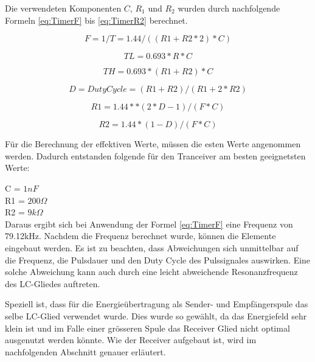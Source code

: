 Die verwendeten Komponenten $C$, $R_{1}$ und $R_{2}$ wurden durch nachfolgende Formeln \ref{eq:TimerF} bis \ref{eq:TimerR2} berechnet. 

\begin{equation}\label{eq:TimerF}
F=1/T= 1.44/((R1+R2*2)*C)
\end{equation} 

\begin{equation}\label{eq:TimerTL}
TL= 0.693*R*C
\end{equation}

\begin{equation}\label{eq:TimerTH}
TH= 0.693*(R1+R2)*C
\end{equation}

\begin{equation}\label{eq:TimerD}
D= Duty Cycle= (R1+R2)/(R1+2*R2)
\end{equation}

\begin{equation}\label{eq:TimerR1}
R1= 1.44**(2*D-1)/(F*C)
\end{equation}

\begin{equation}\label{eq:TimerR2}
R2= 1.44*(1-D)/(F*C)
\end{equation}

Für die Berechnung der effektiven Werte, müssen die esten Werte angenommen werden. Dadurch entstanden folgende für den Tranceiver am besten geeignetsten Werte:
 
C = $1nF$\\
R1 = $200\Omega$\\
R2 = $9k\Omega$\\
 
Daraus ergibt sich bei Anwendung der Formel \ref{eq:TimerF} eine Frequenz von 79.12kHz. Nachdem die Frequenz berechnet wurde, können die Elemente eingebaut werden. Es ist zu beachten, dass Abweichungen sich unmittelbar auf die Frequenz, die Pulsdauer und den Duty Cycle des Pulssignales auswirken. Eine solche Abweichung kann auch durch eine leicht abweichende Resonanzfrequenz des LC-Gliedes auftreten.
 
Speziell ist, dass für die Energieübertragung als Sender- und Empfängerspule das selbe LC-Glied verwendet wurde. Dies wurde so gewählt, da das Energiefeld sehr klein ist und im Falle einer grösseren Spule das Receiver Glied nicht optimal ausgenutzt werden könnte. Wie der Receiver aufgebaut ist, wird im nachfolgenden Abschnitt genauer erläutert.

